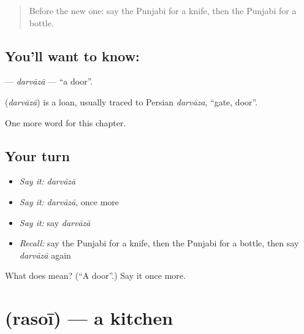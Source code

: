 \label{lesson:PA-C70-darvaza}



\begin{quote}
Before the new one: say the Punjabi for a knife, then the Punjabi for a bottle.
\end{quote}

\subsection*{You'll want to know: }
\textbf{} — \emph{darvāzā} — \textquotedblleft{}a door\textquotedblright{}.

\begin{cousinweb}
\textbf{} (\emph{darvāzā}) is a loan, usually traced to Persian \emph{darvāza}, \textquotedblleft{}gate, door\textquotedblright{}.
\end{cousinweb}

\begin{grammarlens}[title={What you've built}]
One more word for this chapter.
\end{grammarlens}

\subsection*{Your turn}
\begin{itemize}
\raggedright
  \item \emph{Say it:} \emph{darvāzā}
  \item \emph{Say it:} \emph{darvāzā}, once more
  \item \emph{Say it:} say \emph{darvāzā}
  \item \emph{Recall:} say the Punjabi for a knife, then the Punjabi for a bottle, then say \emph{darvāzā} again
\end{itemize}

\begin{tcolorbox}[breakable,colback=teal!4,colframe=teal!35!black,title={Before you move on}]
What does  mean? (\textquotedblleft{}A door\textquotedblright{}.) Say it once more.
\end{tcolorbox}
\section[\texorpdfstring{\pa{ਰਸੋਈ} (rasoī)}{ਰਸੋਈ (rasoī)}]{ (rasoī) — a kitchen}

\label{lesson:PA-C70-rasoi}



